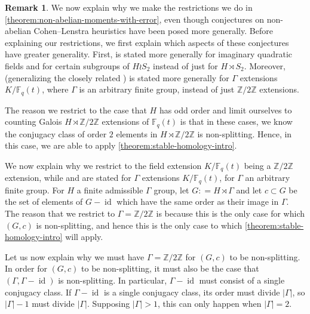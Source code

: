 \documentclass[12 pt]{amsart}
\theoremstyle{plain}
\theoremstyle{definition}
\newtheorem{remark}[theorem]{Remark}
\theoremstyle{remark}
\numberwithin{equation}{section}
\DeclareMathOperator\id{id}
\begin{document}
\begin{remark}
	\label{remark:}
	We now explain why we make the restrictions we do in
	\autoref{theorem:non-abelian-moments-with-error}, even though
	conjectures on non-abelian Cohen--Lenstra heuristics have been posed more
	generally.
	Before explaining our restrictions, we first explain which aspects of these conjectures have greater
	generality.
	First,	
	\cite[Conjecture 5.1]{wood:nonabelian-cohen-lenstra-moments}
	is stated more generally for imaginary quadratic fields
	and for certain subgroups of $H \wr S_2$ instead of just for $H \rtimes S_2$.
	Moreover, 
	\cite[Conjecture 1.2]{liu:non-abelian-cohen-lenstra-in-the-presence-of-roots}
	(generalizing the closely related \cite[Conjecture
	1.3]{liuWZB:a-predicted-distribution})
	is stated more generally for $\Gamma$ extensions $K/\mathbb F_q(t)$,
	where $\Gamma$ is an arbitrary finite group,
	instead of just $\mathbb Z/2 \mathbb Z$ extensions.

	The reason we restrict to the case that $H$ has odd order and limit
	ourselves to counting Galois $H \rtimes \mathbb Z/2 \mathbb Z$ extensions of $\mathbb F_q(t)$
	is that in these cases, we know the conjugacy class of order $2$
	elements in $H \rtimes \mathbb Z/2 \mathbb Z$ is
	non-splitting. Hence, in this case, we are able to apply
	\autoref{theorem:stable-homology-intro}.

	We now explain why we restrict to the field extension $K/\mathbb F_q(t)$
	being a $\mathbb Z/2 \mathbb Z$ extension, while
	\cite[Conjecture
	1.2]{liu:non-abelian-cohen-lenstra-in-the-presence-of-roots} and
	\cite[Conjecture
	1.3]{liuWZB:a-predicted-distribution}
	are stated
	for $\Gamma$ extensions $K/ \mathbb F_q(t)$, for $\Gamma$ an
	arbitrary finite group.
	For $H$ a finite admissible $\Gamma$ group, let $G: = H \rtimes \Gamma$ and
	let $c \subset G$ be the set of elements of $G - \id$ which have the same order as
	their image in $\Gamma$.
	The reason that we restrict to $\Gamma = \mathbb Z/2 \mathbb Z$ is
	because this is the only case for
	which $(G,c)$ is non-splitting, and
	hence this is the only case to which
	\autoref{theorem:stable-homology-intro} will apply.

	Let us now explain why we must have $\Gamma = \mathbb Z/2 \mathbb Z$ for
	$(G,c)$ to be non-splitting.
	In order for $(G,c)$ 
	to be non-splitting, it
	must also be the case that $(\Gamma, \Gamma - \id)$ is non-splitting.
	In particular, $\Gamma - \id$ must consist of a single conjugacy class.
	If $\Gamma - \id$ is a single conjugacy class, its order must divide
	$|\Gamma|$, so $|\Gamma| - 1$ must divide $|\Gamma|$. Supposing $|\Gamma|
	> 1$, this can only happen when $|\Gamma| = 2$. 
\end{remark}
\end{document}
